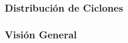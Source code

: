 \documentclass{beamer}
\newtheorem{Th1}{Reseña Historica}
\begin{document}
	\begin{frame}
		\frametitle{Distribución de Ciclones}
		\begin{figure}[!hbt]
		   \centering
		\end{figure}
	\end{frame}

	\begin{frame}
		\frametitle{Visión General}
		\begin{figure}[!hbt]
		   \centering
		\end{figure}
	\end{frame}
\end{document}
